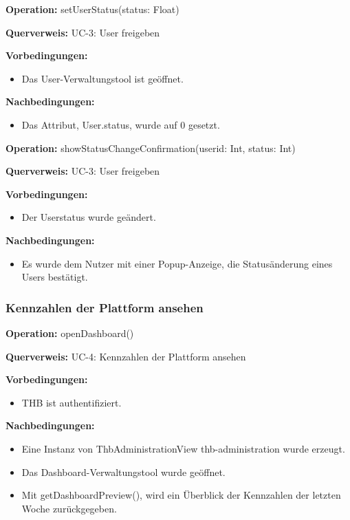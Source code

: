 \documentclass[a4paper,12pt]{article}
\begin{document}
	\begin{contractbox}
		\textbf{Operation:} setUserStatus(status: Float)
		
		\textbf{Querverweis:} UC-3: User freigeben
		
		\textbf{Vorbedingungen:}
		\begin{itemize}[noitemsep]
			\item Das User-Verwaltungstool ist geöffnet.
		\end{itemize}
		
		\textbf{Nachbedingungen:}
		\begin{itemize}[noitemsep]
			\item Das Attribut, User.status, wurde auf 0 gesetzt.
		\end{itemize}
	\end{contractbox}

	\begin{contractbox}
		\textbf{Operation:} showStatusChangeConfirmation(userid: Int, status: Int)
		
			\textbf{Querverweis:} UC-3: User freigeben
		
		\textbf{Vorbedingungen:}
		\begin{itemize}[noitemsep]
			\item Der Userstatus wurde geändert.
		\end{itemize}
		
		\textbf{Nachbedingungen:}
		\begin{itemize}[noitemsep]
			\item Es wurde dem Nutzer mit einer Popup-Anzeige, die Statusänderung eines Users bestätigt.
		\end{itemize}
	\end{contractbox}

	\subsubsection{Kennzahlen der Plattform ansehen}
	\begin{contractbox}
		\textbf{Operation:} openDashboard()
		
			\textbf{Querverweis:} UC-4: Kennzahlen der Plattform ansehen
		
		\textbf{Vorbedingungen:}
		\begin{itemize}[noitemsep]
			\item THB ist authentifiziert.
		\end{itemize}
		
		\textbf{Nachbedingungen:}
		\begin{itemize}[noitemsep]
			\item Eine Instanz von ThbAdministrationView thb-administration wurde erzeugt.
			\item Das Dashboard-Verwaltungstool wurde geöffnet.
			\item Mit getDashboardPreview(), wird ein Überblick der Kennzahlen der letzten Woche zurückgegeben.
		\end{itemize}
	\end{contractbox}
\end{document}
